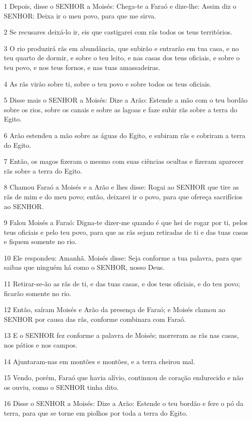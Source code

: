 \par 1 Depois, disse o SENHOR a Moisés: Chega-te a Faraó e dize-lhe: Assim diz o SENHOR: Deixa ir o meu povo, para que me sirva.
\par 2 Se recusares deixá-lo ir, eis que castigarei com rãs todos os teus territórios.
\par 3 O rio produzirá rãs em abundância, que subirão e entrarão em tua casa, e no teu quarto de dormir, e sobre o teu leito, e nas casas dos teus oficiais, e sobre o teu povo, e nos teus fornos, e nas tuas amassadeiras.
\par 4 As rãs virão sobre ti, sobre o teu povo e sobre todos os teus oficiais.
\par 5 Disse mais o SENHOR a Moisés: Dize a Arão: Estende a mão com o teu bordão sobre os rios, sobre os canais e sobre as lagoas e faze subir rãs sobre a terra do Egito.
\par 6 Arão estendeu a mão sobre as águas do Egito, e subiram rãs e cobriram a terra do Egito.
\par 7 Então, os magos fizeram o mesmo com suas ciências ocultas e fizeram aparecer rãs sobre a terra do Egito.
\par 8 Chamou Faraó a Moisés e a Arão e lhes disse: Rogai ao SENHOR que tire as rãs de mim e do meu povo; então, deixarei ir o povo, para que ofereça sacrifícios ao SENHOR.
\par 9 Falou Moisés a Faraó: Digna-te dizer-me quando é que hei de rogar por ti, pelos teus oficiais e pelo teu povo, para que as rãs sejam retiradas de ti e das tuas casas e fiquem somente no rio.
\par 10 Ele respondeu: Amanhã. Moisés disse: Seja conforme a tua palavra, para que saibas que ninguém há como o SENHOR, nosso Deus.
\par 11 Retirar-se-ão as rãs de ti, e das tuas casas, e dos teus oficiais, e do teu povo; ficarão somente no rio.
\par 12 Então, saíram Moisés e Arão da presença de Faraó; e Moisés clamou ao SENHOR por causa das rãs, conforme combinara com Faraó.
\par 13 E o SENHOR fez conforme a palavra de Moisés; morreram as rãs nas casas, nos pátios e nos campos.
\par 14 Ajuntaram-nas em montões e montões, e a terra cheirou mal.
\par 15 Vendo, porém, Faraó que havia alívio, continuou de coração endurecido e não os ouviu, como o SENHOR tinha dito.
\par 16 Disse o SENHOR a Moisés: Dize a Arão: Estende o teu bordão e fere o pó da terra, para que se torne em piolhos por toda a terra do Egito.
